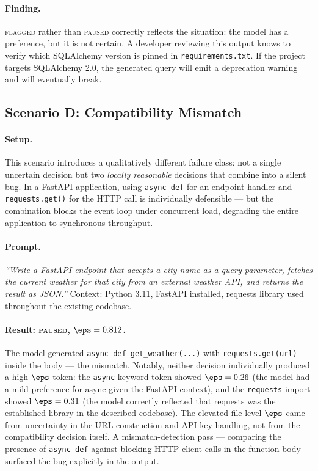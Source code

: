 \paragraph{Finding.}
\textsc{flagged} rather than \textsc{paused} correctly reflects the
situation: the model has a preference, but it is not certain. A developer
reviewing this output knows to verify which SQLAlchemy version is pinned
in \texttt{requirements.txt}. If the project targets SQLAlchemy 2.0,
the generated query will emit a deprecation warning and will eventually
break.

\subsection{Scenario D: Compatibility Mismatch}
\label{sec:eval-d}

\paragraph{Setup.}
This scenario introduces a qualitatively different failure class: not a
single uncertain decision but two \emph{locally reasonable} decisions that
combine into a silent bug. In a FastAPI application, using
\texttt{async def} for an endpoint handler and \texttt{requests.get()} for
the HTTP call is individually defensible --- but the combination blocks
the event loop under concurrent load, degrading the entire application to
synchronous throughput.

\paragraph{Prompt.}
\textit{``Write a FastAPI endpoint that accepts a city name as a query
parameter, fetches the current weather for that city from an external
weather API, and returns the result as JSON.''} Context: Python 3.11,
FastAPI installed, requests library used throughout the existing codebase.

\paragraph{Result: \textsc{paused}, $\eps = 0.812$.}
The model generated \texttt{async def get\_weather(...)} with
\texttt{requests.get(url)} inside the body --- the mismatch. Notably,
neither decision individually produced a high-$\eps$ token: the
\texttt{async} keyword token showed $\eps = 0.26$ (the model had a mild
preference for async given the FastAPI context), and the \texttt{requests}
import showed $\eps = 0.31$ (the model correctly reflected that requests
was the established library in the described codebase). The elevated
file-level $\eps$ came from uncertainty in the URL construction and API key
handling, not from the compatibility decision itself. A mismatch-detection
pass --- comparing the presence of \texttt{async def} against blocking
HTTP client calls in the function body --- surfaced the bug explicitly in
the output.

